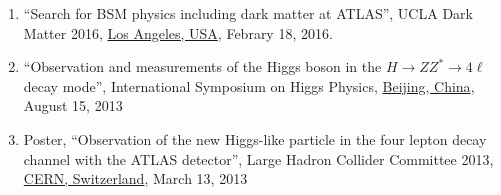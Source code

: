\begin{enumerate}
    \item ``Search for BSM physics including dark matter at ATLAS'', {UCLA Dark Matter 2016}, 
    \href{https://conferences.pa.ucla.edu/dm16/talks/xiangyangju.pdf}{Los Angeles, USA}, Febrary 18, 2016.

    \item ``Observation and measurements of the Higgs boson in the $H\to ZZ^*\to 4\ell$ decay mode'', {International Symposium on Higgs Physics}, 
    \href{http://ishp2013.ihep.ac.cn/index.html}{Beijing, China}, August 15, 2013

    \item Poster, ``Observation of the new Higgs-like particle in the four lepton decay channel with the ATLAS detector'', 
    {Large Hadron Collider Committee 2013}, 
    \href{https://indico.cern.ch/event/238337/}{CERN, Switzerland}, March 13, 2013
\end{enumerate}

    


    
        
        
        
           
